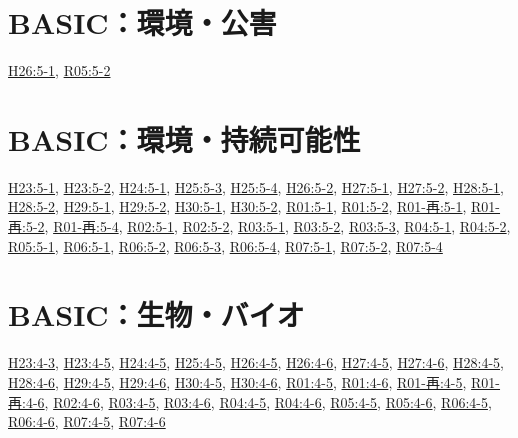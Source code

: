 \section{BASIC：環境・公害}
\hyperref[q:h26-reg-basic-5-1]{H26:5-1}, \hyperref[q:r05-reg-basic-5-2]{R05:5-2}
\section{BASIC：環境・持続可能性}
\hyperref[q:h23-reg-basic-5-1]{H23:5-1}, \hyperref[q:h23-reg-basic-5-2]{H23:5-2}, \hyperref[q:h24-reg-basic-5-1]{H24:5-1}, \hyperref[q:h25-reg-basic-5-3]{H25:5-3}, \hyperref[q:h25-reg-basic-5-4]{H25:5-4}, \hyperref[q:h26-reg-basic-5-2]{H26:5-2}, \hyperref[q:h27-reg-basic-5-1]{H27:5-1}, \hyperref[q:h27-reg-basic-5-2]{H27:5-2}, \hyperref[q:h28-reg-basic-5-1]{H28:5-1}, \hyperref[q:h28-reg-basic-5-2]{H28:5-2}, \hyperref[q:h29-reg-basic-5-1]{H29:5-1}, \hyperref[q:h29-reg-basic-5-2]{H29:5-2}, \hyperref[q:h30-reg-basic-5-1]{H30:5-1}, \hyperref[q:h30-reg-basic-5-2]{H30:5-2}, \hyperref[q:r01-reg-basic-5-1]{R01:5-1}, \hyperref[q:r01-reg-basic-5-2]{R01:5-2}, \hyperref[q:r01-ret-basic-5-1]{R01-再:5-1}, \hyperref[q:r01-ret-basic-5-2]{R01-再:5-2}, \hyperref[q:r01-ret-basic-5-4]{R01-再:5-4}, \hyperref[q:r02-reg-basic-5-1]{R02:5-1}, \hyperref[q:r02-reg-basic-5-2]{R02:5-2}, \hyperref[q:r03-reg-basic-5-1]{R03:5-1}, \hyperref[q:r03-reg-basic-5-2]{R03:5-2}, \hyperref[q:r03-reg-basic-5-3]{R03:5-3}, \hyperref[q:r04-reg-basic-5-1]{R04:5-1}, \hyperref[q:r04-reg-basic-5-2]{R04:5-2}, \hyperref[q:r05-reg-basic-5-1]{R05:5-1}, \hyperref[q:r06-reg-basic-5-1]{R06:5-1}, \hyperref[q:r06-reg-basic-5-2]{R06:5-2}, \hyperref[q:r06-reg-basic-5-3]{R06:5-3}, \hyperref[q:r06-reg-basic-5-4]{R06:5-4}, \hyperref[q:r07-reg-basic-5-1]{R07:5-1}, \hyperref[q:r07-reg-basic-5-2]{R07:5-2}, \hyperref[q:r07-reg-basic-5-4]{R07:5-4}
\section{BASIC：生物・バイオ}
\hyperref[q:h23-reg-basic-4-3]{H23:4-3}, \hyperref[q:h23-reg-basic-4-5]{H23:4-5}, \hyperref[q:h24-reg-basic-4-5]{H24:4-5}, \hyperref[q:h25-reg-basic-4-5]{H25:4-5}, \hyperref[q:h26-reg-basic-4-5]{H26:4-5}, \hyperref[q:h26-reg-basic-4-6]{H26:4-6}, \hyperref[q:h27-reg-basic-4-5]{H27:4-5}, \hyperref[q:h27-reg-basic-4-6]{H27:4-6}, \hyperref[q:h28-reg-basic-4-5]{H28:4-5}, \hyperref[q:h28-reg-basic-4-6]{H28:4-6}, \hyperref[q:h29-reg-basic-4-5]{H29:4-5}, \hyperref[q:h29-reg-basic-4-6]{H29:4-6}, \hyperref[q:h30-reg-basic-4-5]{H30:4-5}, \hyperref[q:h30-reg-basic-4-6]{H30:4-6}, \hyperref[q:r01-reg-basic-4-5]{R01:4-5}, \hyperref[q:r01-reg-basic-4-6]{R01:4-6}, \hyperref[q:r01-ret-basic-4-5]{R01-再:4-5}, \hyperref[q:r01-ret-basic-4-6]{R01-再:4-6}, \hyperref[q:r02-reg-basic-4-6]{R02:4-6}, \hyperref[q:r03-reg-basic-4-5]{R03:4-5}, \hyperref[q:r03-reg-basic-4-6]{R03:4-6}, \hyperref[q:r04-reg-basic-4-5]{R04:4-5}, \hyperref[q:r04-reg-basic-4-6]{R04:4-6}, \hyperref[q:r05-reg-basic-4-5]{R05:4-5}, \hyperref[q:r05-reg-basic-4-6]{R05:4-6}, \hyperref[q:r06-reg-basic-4-5]{R06:4-5}, \hyperref[q:r06-reg-basic-4-6]{R06:4-6}, \hyperref[q:r07-reg-basic-4-5]{R07:4-5}, \hyperref[q:r07-reg-basic-4-6]{R07:4-6}
